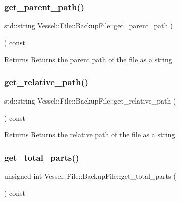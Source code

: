 \subsubsection{\texorpdfstring{get\+\_\+parent\+\_\+path()}{get\_parent\_path()}}
{\footnotesize\ttfamily std\+::string Vessel\+::\+File\+::\+Backup\+File\+::get\+\_\+parent\+\_\+path (\begin{DoxyParamCaption}{ }\end{DoxyParamCaption}) const}

\begin{DoxyReturn}{Returns}
Returns the parent path of the file as a string 
\end{DoxyReturn}
\mbox{\label{class_vessel_1_1_file_1_1_backup_file_aaa9162554abefd5a1473218917168b65}} 
\subsubsection{\texorpdfstring{get\+\_\+relative\+\_\+path()}{get\_relative\_path()}}
{\footnotesize\ttfamily std\+::string Vessel\+::\+File\+::\+Backup\+File\+::get\+\_\+relative\+\_\+path (\begin{DoxyParamCaption}{ }\end{DoxyParamCaption}) const}

\begin{DoxyReturn}{Returns}
Returns the relative path of the file as a string 
\end{DoxyReturn}
\mbox{\label{class_vessel_1_1_file_1_1_backup_file_ab206576fee90fd5549d8d12dc6ea5848}} 
\subsubsection{\texorpdfstring{get\+\_\+total\+\_\+parts()}{get\_total\_parts()}}
{\footnotesize\ttfamily unsigned int Vessel\+::\+File\+::\+Backup\+File\+::get\+\_\+total\+\_\+parts (\begin{DoxyParamCaption}{ }\end{DoxyParamCaption}) const}

